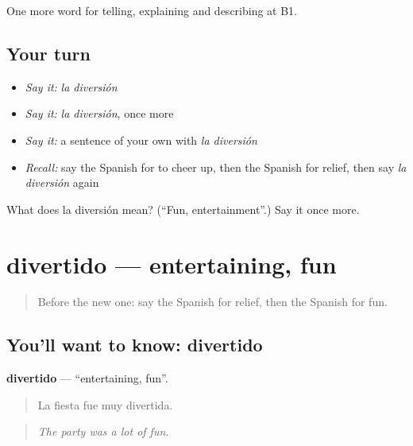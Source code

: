 \begin{grammarlens}[title={What you've built}]
One more word for telling, explaining and describing at B1.
\end{grammarlens}

\subsection*{Your turn}
\begin{itemize}
\raggedright
  \item \emph{Say it:} \emph{la diversión}
  \item \emph{Say it:} \emph{la diversión}, once more
  \item \emph{Say it:} a sentence of your own with \emph{la diversión}
  \item \emph{Recall:} say the Spanish for to cheer up, then the Spanish for relief, then say \emph{la diversión} again
\end{itemize}

\begin{tcolorbox}[breakable,colback=teal!4,colframe=teal!35!black,title={Before you move on}]
What does la diversión mean? (\textquotedblleft{}Fun, entertainment\textquotedblright{}.) Say it once more.
\end{tcolorbox}
\section[divertido]{divertido — entertaining, fun}

\label{lesson:ES-C713-divertido}



\begin{quote}
Before the new one: say the Spanish for relief, then the Spanish for fun.
\end{quote}

\subsection*{You'll want to know: divertido}
\textbf{divertido} — \textquotedblleft{}entertaining, fun\textquotedblright{}.

\begin{quote}
La fiesta fue muy divertida.
\end{quote}

\begin{quote}
\emph{The party was a lot of fun.}
\end{quote}

